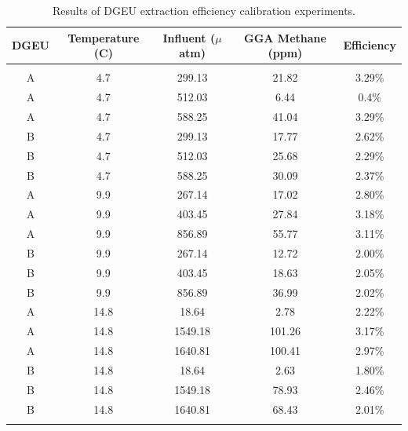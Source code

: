 \begin{table}[h!]
    \centering
    \begin{tabular}{c|c|c|c|c}
        DGEU & Temperature (C) & Influent ($\mu$atm) & GGA Methane (ppm) & Efficiency  \\
        \hline
        \hline
        & & & & \\
        A & 4.7 & 299.13 & 21.82 & 3.29\% \\
        A & 4.7 & 512.03 & 6.44 & 0.4\% \\
        A & 4.7 & 588.25 & 41.04 & 3.29\% \\
        B & 4.7 & 299.13 & 17.77 & 2.62\% \\
        B & 4.7 & 512.03 & 25.68 & 2.29\% \\
        B & 4.7 & 588.25 & 30.09 & 2.37\% \\
        A & 9.9 & 267.14 & 17.02 & 2.80\% \\
        A & 9.9 & 403.45 & 27.84 & 3.18\%  \\
        A & 9.9 & 856.89 & 55.77 & 3.11\% \\
        B & 9.9 & 267.14 & 12.72 & 2.00\% \\
        B & 9.9 & 403.45 & 18.63 & 2.05\% \\
        B & 9.9 & 856.89 & 36.99 & 2.02\% \\
        A & 14.8 & 18.64 & 2.78 & 2.22\% \\
        A & 14.8 & 1549.18 & 101.26 & 3.17\%  \\
        A & 14.8 & 1640.81 & 100.41 & 2.97\% \\
        B & 14.8 & 18.64 & 2.63 & 1.80\% \\
        B & 14.8 & 1549.18 & 78.93 & 2.46\% \\
        B & 14.8 & 1640.81 & 68.43 & 2.01\% \\
        & & & & \\
        
    \end{tabular}
    \caption{Results of DGEU extraction efficiency calibration experiments.}
    \label{tab:extraction}
\end{table}



